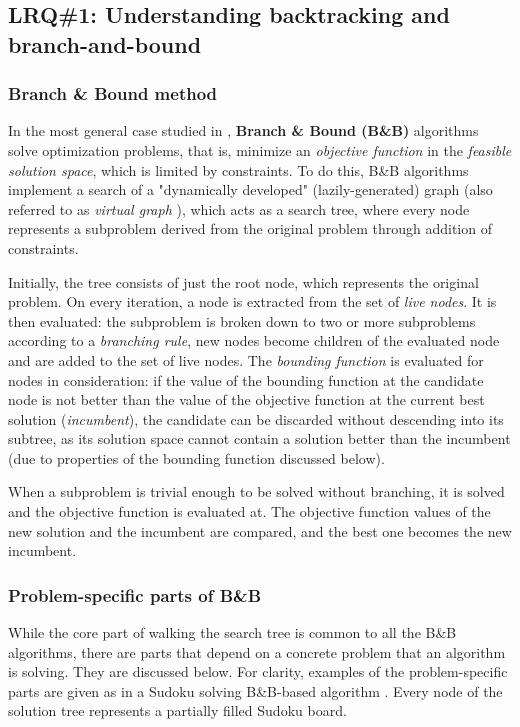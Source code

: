 \subsection{LRQ\#1: Understanding backtracking and branch-and-bound}

\subsubsection{Branch \& Bound method}

In the most general case studied in \cite{clausen1999principles}, \textbf{Branch \& Bound (B\&B)}
algorithms solve optimization problems, that is, minimize an \emph{objective function} in the
\emph{feasible solution space}, which is limited by constraints. To do this, B\&B algorithms
implement a search of a "dynamically developed" (lazily-generated) graph
(also referred to as \emph{virtual graph}
    \cite{shilov2011rutemplateverif, shilov2012verifmono}),
which acts as a search tree, where every node represents a subproblem derived from the
original problem through addition of constraints.

Initially, the tree consists of just the root node, which represents the original problem.
On every iteration, a node is extracted from the set of \emph{live nodes}.
It is then evaluated: the subproblem is broken down to
two \cite{narkawicz2013formalnasa} or more \cite{clausen1999principles}
subproblems according to a
\emph{branching rule}, new nodes become children of the evaluated node and are added
to the set of live nodes. The \emph{bounding function} is evaluated for nodes in
consideration: if the value of the bounding function at the candidate node is
not better than the value of the objective function at the current
best solution (\emph{incumbent}), the candidate can be discarded without descending into
its subtree, as its solution space cannot contain a solution better than the incumbent
(due to properties of the bounding function discussed below).

When a subproblem is trivial enough to be solved without branching, it is solved
and the objective function is evaluated at. The objective function values of the new
solution and the incumbent are compared, and the best one becomes the new incumbent.

\subsubsection{Problem-specific parts of B\&B}

While the core part of walking the search tree is common to all the B\&B algorithms,
there are parts that depend on a concrete problem that an algorithm is solving. They
are discussed below. For clarity, examples of the problem-specific parts are given
as in a Sudoku solving B\&B-based algorithm \cite{indriyono2024sudoku}. Every node
of the solution tree represents a partially filled Sudoku board.

